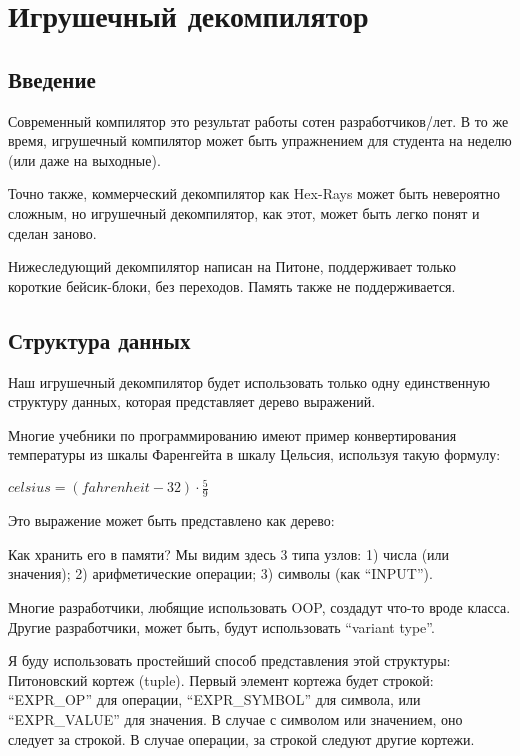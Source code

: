﻿\section{Игрушечный декомпилятор}
\label{toy_decompiler}

\subsection{Введение}

Современный компилятор это результат работы сотен разработчиков/лет.
В то же время, игрушечный компилятор может быть упражнением для студента на неделю (или даже на выходные).

Точно также, коммерческий декомпилятор как Hex-Rays может быть невероятно сложным,
но игрушечный декомпилятор, как этот, может быть легко понят и сделан заново.

Нижеследующий декомпилятор написан на Питоне, поддерживает только короткие бейсик-блоки, без переходов.
Память также не поддерживается.

\subsection{Структура данных}

Наш игрушечный декомпилятор будет использовать только одну единственную структуру данных, которая представляет дерево выражений.

Многие учебники по программированию имеют пример конвертирования температуры из шкалы Фаренгейта в шкалу Цельсия, используя
такую формулу:

\begin{center}
{\large $celsius = (fahrenheit - 32) \cdot \frac{5}{9}$}
\end{center}

Это выражение может быть представлено как дерево:



Как хранить его в памяти?
Мы видим здесь 3 типа узлов: 1) числа (или значения); 2) арифметические операции; 3) символы (как ``INPUT'').

Многие разработчики, любящие использовать \ac{OOP}, создадут что-то вроде класса.
Другие разработчики, может быть, будут использовать ``variant type''.

Я буду использовать простейший способ представления этой структуры: Питоновский кортеж (tuple).
Первый элемент кортежа будет строкой:
``EXPR\_OP'' для операции, ``EXPR\_SYMBOL'' для символа, или ``EXPR\_VALUE'' для значения.
В случае с символом или значением, оно следует за строкой.
В случае операции, за строкой следуют другие кортежи.

